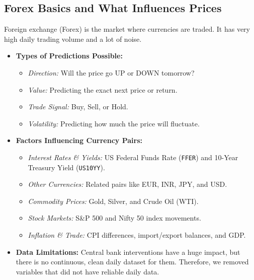 \subsection{Forex Basics and What Influences Prices}
Foreign exchange (Forex) is the market where currencies are traded. It has very high daily trading volume and a lot of noise.
\begin{itemize}[leftmargin=1.5cm, itemsep=1pt]
	\item \textbf{Types of Predictions Possible:}
	\begin{itemize}
		\item \textit{Direction:} Will the price go UP or DOWN tomorrow?
		\item \textit{Value:} Predicting the exact next price or return.
		\item \textit{Trade Signal:} Buy, Sell, or Hold.
		\item \textit{Volatility:} Predicting how much the price will fluctuate.
	\end{itemize}
	\item \textbf{Factors Influencing Currency Pairs:}
	\begin{itemize}
		\item \textit{Interest Rates \& Yields:} US Federal Funds Rate (\texttt{FFER}) and 10-Year Treasury Yield (\texttt{US10YY}).
		\item \textit{Other Currencies:} Related pairs like EUR, INR, JPY, and USD.
		\item \textit{Commodity Prices:} Gold, Silver, and Crude Oil (WTI).
		\item \textit{Stock Markets:} S\&P 500 and Nifty 50 index movements.
		\item \textit{Inflation \& Trade:} CPI differences, import/export balances, and GDP.
	\end{itemize}
	\item \textbf{Data Limitations:} Central bank interventions have a huge impact, but there is no continuous, clean daily dataset for them. Therefore, we removed variables that did not have reliable daily data.
\end{itemize}

